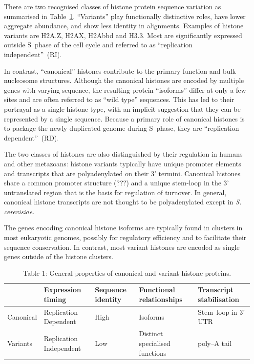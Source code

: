 \documentclass[10pt,a4paper,draft,article]{memoir}
\begin{document}
    There are two recognised classes of histone protein sequence variation as summarised in
    Table~\ref{tab:typical-histone-differences}. ``Variants'' play functionally distinctive
    roles, have lower aggregate abundance,
    and show less identity in alignments. Examples of histone variants are H2A.Z, H2AX, H2Abbd
    and H3.3. Most are significantly expressed outside S~phase of the cell cycle and referred
    to as ``replication independent''~(RI).

    In contrast, ``canonical'' histones contribute to the primary function and bulk nucleosome
    structures. Although the canonical histones are encoded by multiple genes with varying
    sequence, the resulting protein ``isoforms'' differ at only a few sites and are often
    referred to as ``wild type'' sequences. This has led to their portrayal as a single histone
    type, with an implicit suggestion that they can be represented by a single sequence. Because
    a primary role of canonical histones is to package the newly duplicated genome during
    S~phase, they are ``replication dependent''~(RD).

    The two classes of histones are also distinguished by their regulation in humans and other
    metazoans: histone variants typically have unique promoter elements and transcripts that
    are polyadenylated on their 3' termini.  Canonical
    histones share a common promoter structure (???) and a unique stem-loop in the 3' untranslated
    region that is the basis for regulation of turnover. In general, canonical histone transcripts
    are not thought to be polyadenylated except in \textit{S. cerevisiae}.

    The genes encoding canonical histone isoforms are typically found in clusters in most eukaryotic
    genomes, possibly for regulatory efficiency and to facilitate their sequence conservation. In
    contrast, most variant histones are encoded as single genes outside of the histone clusters.

    \begin{table}
      \caption{Table 1: General properties of canonical and variant histone proteins.}
      \label{tab:typical-histone-differences}
      \centering
      \begin{tabular}{l | l | l | l | l }
        \null     & Expression timing       & Sequence identity & Functional relationships       & Transcript stabilisation \\
        \hline
        Canonical & Replication Dependent   & High              & Isoforms                       & Stem--loop in 3' UTR \\
        Variants  & Replication Independent & Low               & Distinct specialised functions & poly--A tail \\
      \end{tabular}
    \end{table}
\end{document}
